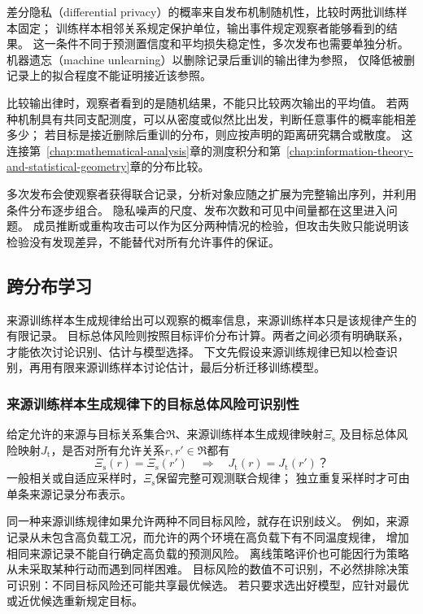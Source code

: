 差分隐私（differential privacy）的概率来自发布机制随机性，比较时两批训练样本固定；
训练样本相邻关系规定保护单位，输出事件规定观察者能够看到的结果。
这一条件不同于预测置信度和平均损失稳定性，多次发布也需要单独分析。
机器遗忘（machine unlearning）以删除记录后重训的输出律为参照，
仅降低被删记录上的拟合程度不能证明接近该参照。

比较输出律时，观察者看到的是随机结果，不能只比较两次输出的平均值。
若两种机制具有共同支配测度，可以从密度或似然比出发，判断任意事件的概率能相差多少；
若目标是接近删除后重训的分布，则应按声明的距离研究耦合或散度。
这连接第~\ref{chap:mathematical-analysis}章的测度积分和第~\ref{chap:information-theory-and-statistical-geometry}章的分布比较。

多次发布会使观察者获得联合记录，分析对象应随之扩展为完整输出序列，并利用条件分布逐步组合。
隐私噪声的尺度、发布次数和可见中间量都在这里进入问题。
成员推断或重构攻击可以作为区分两种情况的检验，但攻击失败只能说明该检验没有发现差异，不能替代对所有允许事件的保证。

\subsection{跨分布学习}
\label{sec:future-transfer-theory-map}

来源训练样本生成规律给出可以观察的概率信息，来源训练样本只是该规律产生的有限记录。
目标总体风险则按照目标评价分布计算。两者之间必须有明确联系，才能依次讨论识别、估计与模型选择。
下文先假设来源训练规律已知以检查识别，再用有限来源训练样本讨论估计，最后分析迁移训练模型。

\subsubsection{来源训练样本生成规律下的目标总体风险可识别性}
\label{sec:future-analysis-source-target}

\begin{mathproblem}[来源训练规律是否确定目标总体风险]
  \label{question:future-source-target}
  给定允许的来源与目标关系集合$\mathfrak R$、来源训练样本生成规律映射$\Xi_{\mathrm s}$
  及目标总体风险映射$J_{\mathrm t}$，是否对所有允许关系$r,r'\in\mathfrak R$都有
  \[
    \Xi_{\mathrm s}(r)=\Xi_{\mathrm s}(r')
    \quad\Longrightarrow\quad J_{\mathrm t}(r)=J_{\mathrm t}(r')\text{？}
  \]
  一般相关或自适应采样时，$\Xi_{\mathrm s}$保留完整可观测联合规律；
  独立重复采样时才可由单条来源记录分布表示。
\end{mathproblem}

同一种来源训练规律如果允许两种不同目标风险，就存在识别歧义。
例如，来源记录从未包含高负载工况，而允许的两个环境在高负载下有不同温度规律，
增加相同来源记录不能自行确定高负载的预测风险。
离线策略评价也可能因行为策略从未采取某种行动而遇到同样困难。
目标风险的数值不可识别，不必然排除决策可识别：不同目标风险还可能共享最优候选。
若只要求选出好模型，应针对最优或近优候选重新规定目标。

